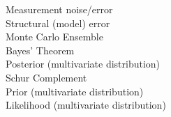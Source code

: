 \documentclass[english]{article}
\begin{document}
\begin{description}
\item [Measurement noise/error]
\item [Structural (model) error]
\item [Monte Carlo Ensemble]
\item [Bayes' Theorem]
\item [Posterior (multivariate distribution)]
\item [Schur Complement]
\item [Prior (multivariate distribution)]
\item [Likelihood (multivariate distribution)] 

\end{description}
\end{document}
